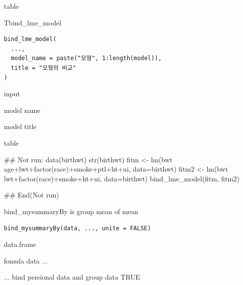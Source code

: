 \documentclass[a4paper]{book}
\begin{document}
%
\begin{Value}
table
\end{Value}
%
\begin{Description}
Tbind\_lme\_model
\end{Description}
%
\begin{Usage}
\begin{verbatim}
bind_lme_model(
  ...,
  model_name = paste("모형", 1:length(model)),
  title = "모형의 비교"
)
\end{verbatim}
\end{Usage}
%
\begin{Arguments}
\begin{ldescription}
\item[\code{...}] input

\item[\code{model\_name}] model name

\item[\code{title}] model title
\end{ldescription}
\end{Arguments}
%
\begin{Value}
table
\end{Value}
%
\begin{Examples}
\begin{ExampleCode}
\#\# Not run: 
data(birthwt)
str(birthwt)
fitm <- lm(bwt ~ age+lwt+factor(race)+smoke+ptl+ht+ui, data=birthwt)
fitm2 <- lm(bwt ~ lwt+factor(race)+smoke+ht+ui, data=birthwt)
bind_lme_model(fitm, fitm2)


## End(Not run)
\end{ExampleCode}
\end{Examples}
%
\begin{Description}
bind\_mysummaryBy is group mean of mean
\end{Description}
%
\begin{Usage}
\begin{verbatim}
bind_mysummaryBy(data, ..., unite = FALSE)
\end{verbatim}
\end{Usage}
%
\begin{Arguments}
\begin{ldescription}
\item[\code{data}] data.frame

\item[\code{...}] fomula data ...

\item[\code{unite}] ... bind persional data and group data  TRUE
\end{ldescription}
\end{Arguments}
\end{document}
